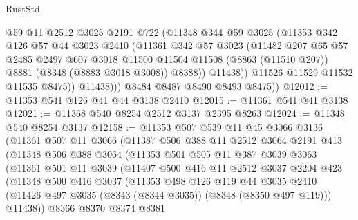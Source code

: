 \begin{lexlean}{RustStd}
\begin{coremodule}
{\begin{coremodule}
{{{{{{{{{{{{{{{{{{{{{{{{{{{{{{{{{{{{{{{{{{{{{{{{{{                  @59
                  @11
                  @2512
                  @3025
                  @2191
                  @722
                  (@11348
                    @344
                    @59
                    @3025
                    (@11353
                      @342
                      @126
                      @57
                      @44
                      @3023
                      @2410
                      (@11361
                        @342
                        @57
                        @3023
                        (@11482
                          @207
                          @65
                          @57
                          @2485
                          @2497
                          @607
                          @3018
                          @11500
                          @11504
                          @11508
                          (@8863 (@11510 @207))
                          @8881
                          (@8348 (@8883 @3018 @3008))
                          @8388))
                      @11438))
                  @11526
                  @11529
                  @11532
                  @11535
                  @8475))
              @11438)))
        @8484
        @8487
        @8490
        @8493
        @8475))
@12012 := @11353 @541 @126 @41 @44 @3138 @2410
@12015 := @11361 @541 @41 @3138
@12021 := @11368 @540 @8254 @2512 @3137 @2395 @8263
@12024 := @11348 @540 @8254 @3137
@12158 := @11353
    @507
    @539
    @11
    @45
    @3066
    @3136
    (@11361
      @507
      @11
      @3066
      (@11387
        @506
        @388
        @11
        @2512
        @3064
        @2191
        @413
        (@11348
          @506
          @388
          @3064
          (@11353
            @501
            @505
            @11
            @387
            @3039
            @3063
            (@11361
              @501
              @11
              @3039
              (@11407
                @500
                @416
                @11
                @2512
                @3037
                @2204
                @423
                (@11348
                  @500
                  @416
                  @3037
                  (@11353
                    @498
                    @126
                    @119
                    @44
                    @3035
                    @2410
                    (@11426 @497 @3035 (@8343 (@8344 @3035)) (@8348 (@8350 @497 @119)))
                    @11438))
                @8366
                @8370
                @8374
                @8381
}}}}}}}}}}}}}}}}}}}}}}}}}}}}}}}}}}}}}}}}}}}}}}}}}}
\end{coremodule}}
\end{coremodule}
\end{lexlean}
